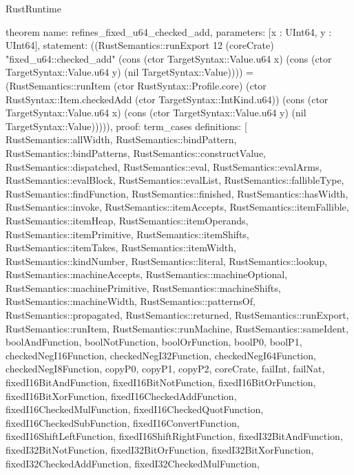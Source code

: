 \begin{lexlean}{RustRuntime}
\begin{semanticmodule}
theorem{
  name: refines_fixed_u64_checked_add,
  parameters: [x : UInt64, y : UInt64],
  statement: ((RustSemantics::runExport 12 (coreCrate) "fixed_u64::checked_add" (cons (ctor TargetSyntax::Value.u64 x) (cons (ctor TargetSyntax::Value.u64 y) (nil TargetSyntax::Value)))) = (RustSemantics::runItem (ctor RustSyntax::Profile.core) (ctor RustSyntax::Item.checkedAdd (ctor TargetSyntax::IntKind.u64)) (cons (ctor TargetSyntax::Value.u64 x) (cons (ctor TargetSyntax::Value.u64 y) (nil TargetSyntax::Value))))),
  proof: term_cases{
    definitions: [
      RustSemantics::allWidth,
      RustSemantics::bindPattern,
      RustSemantics::bindPatterns,
      RustSemantics::constructValue,
      RustSemantics::dispatched,
      RustSemantics::eval,
      RustSemantics::evalArms,
      RustSemantics::evalBlock,
      RustSemantics::evalList,
      RustSemantics::fallibleType,
      RustSemantics::findFunction,
      RustSemantics::finished,
      RustSemantics::hasWidth,
      RustSemantics::invoke,
      RustSemantics::itemAccepts,
      RustSemantics::itemFallible,
      RustSemantics::itemHeap,
      RustSemantics::itemOperands,
      RustSemantics::itemPrimitive,
      RustSemantics::itemShifts,
      RustSemantics::itemTakes,
      RustSemantics::itemWidth,
      RustSemantics::kindNumber,
      RustSemantics::literal,
      RustSemantics::lookup,
      RustSemantics::machineAccepts,
      RustSemantics::machineOptional,
      RustSemantics::machinePrimitive,
      RustSemantics::machineShifts,
      RustSemantics::machineWidth,
      RustSemantics::patternsOf,
      RustSemantics::propagated,
      RustSemantics::returned,
      RustSemantics::runExport,
      RustSemantics::runItem,
      RustSemantics::runMachine,
      RustSemantics::sameIdent,
      boolAndFunction,
      boolNotFunction,
      boolOrFunction,
      boolP0,
      boolP1,
      checkedNegI16Function,
      checkedNegI32Function,
      checkedNegI64Function,
      checkedNegI8Function,
      copyP0,
      copyP1,
      copyP2,
      coreCrate,
      failInt,
      failNat,
      fixedI16BitAndFunction,
      fixedI16BitNotFunction,
      fixedI16BitOrFunction,
      fixedI16BitXorFunction,
      fixedI16CheckedAddFunction,
      fixedI16CheckedMulFunction,
      fixedI16CheckedQuotFunction,
      fixedI16CheckedSubFunction,
      fixedI16ConvertFunction,
      fixedI16ShiftLeftFunction,
      fixedI16ShiftRightFunction,
      fixedI32BitAndFunction,
      fixedI32BitNotFunction,
      fixedI32BitOrFunction,
      fixedI32BitXorFunction,
      fixedI32CheckedAddFunction,
      fixedI32CheckedMulFunction,
}}
\end{semanticmodule}
\end{lexlean}
